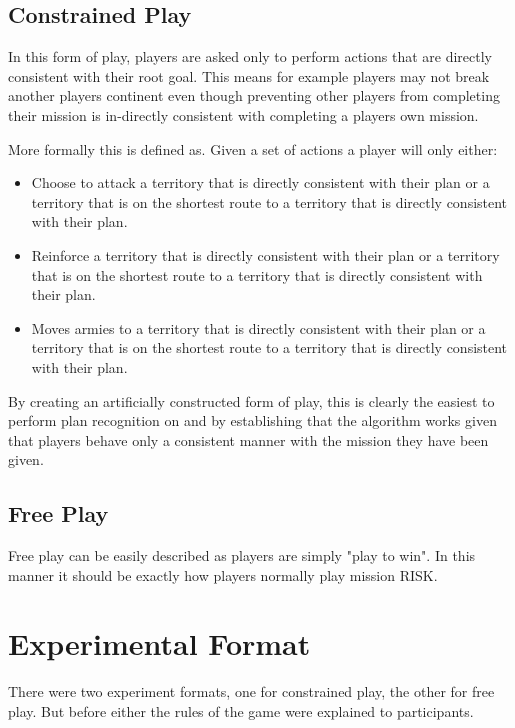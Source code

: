 \documentclass[parskip]{cs4rep}
\begin{document}
\subsection{Constrained Play}

In this form of play, players are asked only to perform actions that are directly consistent with their root goal. This means for example players may not break another players continent even though preventing other players from completing their mission is in-directly consistent with completing a players own mission.

More formally this is defined as. Given a set of actions a player will only either:

\begin{itemize}
\item
Choose to attack a territory that is directly consistent with their plan or a territory that is on the shortest route to a territory that is directly consistent with their plan.
\item
Reinforce a territory that is directly consistent with their plan or a territory that is on the shortest route to a territory that is directly consistent with their plan.
\item
Moves armies to a territory that is directly consistent with their plan or a territory that is on the shortest route to a territory that is directly consistent with their plan.
\end{itemize}

By creating an artificially constructed form of play, this is clearly the easiest to perform plan recognition on and by establishing that the algorithm works given that players behave only a consistent manner with the mission they have been given.

\subsection{Free Play}

Free play can be easily described as players are simply "play to win". In this manner it should be exactly how players normally play mission RISK.

\section{Experimental Format}

There were two experiment formats, one for constrained play, the other for free play. But before either the rules of the game were explained to participants. 
\end{document}
